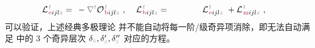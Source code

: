 \begin{subequations}
\begin{align}
	&{\mathcal{L}}^{\;\!\mathcolor{gray}{t}}_{\;\!\textcolor{Maroon}{\text{e}} ijl \mathcolor{gray}{z}} \hspace{-1em}&&=\hspace{0.2em} &&\hspace{-0.7em}- \mathcolor{gray}{\nabla^t} {\mathcal{O}}^{\;\!\mathcolor{gray}{t}}_{\;\!\textcolor{Maroon}{\text{b}} ijl \mathcolor{gray}{z}}~, &&\hspace{0.3em} {\mathcal{L}}^{\;\!\mathcolor{gray}{t}}_{\;\!\textcolor{Maroon}{\text{b}} ijl \mathcolor{gray}{z}} \hspace{-1em}&&=\hspace{0.2em} ~ \hphantom{-\frac{1}{2!} \epsilon^{\hphantom{ij}k}_{i\mathcolor{gray}{j}}} {\mathcal{L}}^{\;\!\mathcolor{gray}{t}}_{\;\!\textcolor{Maroon}{\text{e}} ijl \mathcolor{gray}{z}} &&\hspace{-0.7em}+ {\mathcal{L}}^{\;\!\mathcolor{gray}{t}}_{\;\!\textcolor{Maroon}{\text{m}} ijl \mathcolor{gray}{z}}~, \label{eq:Le-Lb}
\end{align}
\end{subequations}
可以验证，上述经典多极理论  并不能自动将每一阶/级奇异项消除，即无法自动满足  中的 3 个奇异层次 ${\delta}_{\mathcolor{gray}{z}},{\delta}'_{\mathcolor{gray}{z}},{\delta}''_{\mathcolor{gray}{z}}$ 对应的方程。

